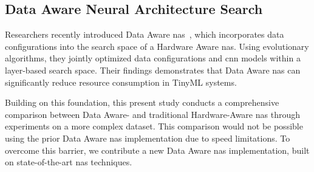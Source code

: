 \subsection{Data Aware Neural Architecture Search}
Researchers recently introduced Data Aware \gls{nas}~\cite{njor2023data}, which incorporates data configurations into the search space of a Hardware Aware \gls{nas}.
Using evolutionary algorithms, they jointly optimized data configurations and \gls{cnn} models within a layer-based search space.
Their findings demonstrates that Data Aware \gls{nas} can significantly reduce resource consumption in TinyML systems.

Building on this foundation, this present study conducts a comprehensive comparison between Data Aware- and traditional Hardware-Aware \gls{nas} through experiments on a more complex dataset.
This comparison would not be possible using the prior Data Aware \gls{nas} implementation due to speed limitations.
To overcome this barrier, we contribute a new Data Aware \gls{nas} implementation, built on state-of-the-art \gls{nas} techniques.